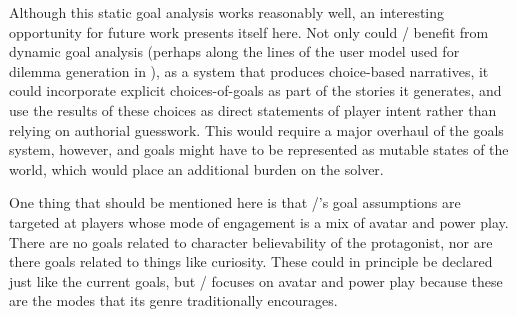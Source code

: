 \begin{enumerate}[leftmargin=1.4em]
Although this static goal analysis works reasonably well, an interesting opportunity for future work presents itself here.
%
Not only could \dunyazad/ benefit from dynamic goal analysis (perhaps along the lines of the user model used for dilemma generation in \citep{Barber2007b}), as a system that produces choice-based narratives, it could incorporate explicit choices-of-goals as part of the stories it generates, and use the results of these choices as direct statements of player intent rather than relying on authorial guesswork.
%
This would require a major overhaul of the goals system, however, and goals might have to be represented as mutable states of the world, which would place an additional burden on the solver.

\label{sec:dunyazad-modes-of-engagement}%
One thing that should be mentioned here is that \dunyazad/'s goal assumptions are targeted at players whose mode of engagement is a mix of avatar and power play.
%
There are no goals related to character believability of the protagonist, nor are there goals related to things like curiosity.
%
These could in principle be declared just like the current goals, but \dunyazad/ focuses on avatar and power play because these are the modes that its genre traditionally encourages.


\end{enumerate}
